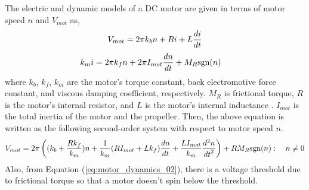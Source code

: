 The electric and dynamic models of a DC motor are given in terms of motor speed \(n\) and \(V_{mot}\) as,
\begin{equation}
\label{eq:motor_dynamics_01}
\begin{aligned}
V_{mot} & = 2 \pi k_{b} n + R i + L {{di}\over {dt}}\\
\end{aligned}
\end{equation}
\begin{equation}
\label{eq:motor_dynamics_02}
\begin{aligned}
k_m i & = 2 \pi k_f n + 2 \pi I_{mot} {{dn} \over {dt} } + M_R \text{sgn} (n)
\end{aligned}
\end{equation}
where \(k_{b} \), \(k_f\), \(k_m\) are the motor's torque constant, back electromotive force constant, and viscous damping coefficient, respectively. \(M_R\) is frictional torque, \(R\) is the motor's internal resistor, and \(L\) is the motor's internal inductance \cite{Mahfouz13}. \(I_{mot}\) is the total inertia of the motor and the propeller. Then, the above equation is written as the following second-order system with respect to motor speed \(n\). \\
\begin{equation}
\label{eq:motor_model_01}
\begin{aligned}
V_{mot} = 2 \pi \left( (k_b + {{R k_f}\over{k_m}} ) n + {1 \over {k_m}}( {R I_{mot}} + L k_f ) {{dn}\over{dt}} + {{L I_{mot}} \over {k_m} } {{d^2 n}\over{{dt}^2}}  \right) + R M_R \text{sgn} (n) : \quad n \neq 0\\
\end{aligned}
\end{equation}
Also, from Equation (\ref{eq:motor_dynamics_02}), there is a voltage threshold due to frictional torque so that a motor doesn't spin below the threshold. \\

